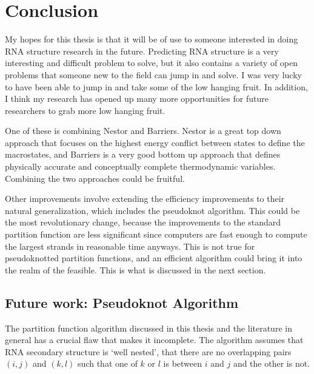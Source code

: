\chapter{Conclusion}

My hopes for this thesis is that it will be of use to someone
interested in doing RNA structure research in the future. Predicting
RNA structure is a very interesting and difficult problem to solve,
but it also contains a variety of open problems that someone new to
the field can jump in and solve. I was very lucky to have been able to
jump in and take some of the low hanging fruit. In addition, I think
my research has opened up many more opportunities for future
researchers to grab more low hanging fruit.

One of these is combining Nestor and Barriers. Nestor is a great top
down approach that focuses on the highest energy conflict between
states to define the macrostates, and Barriers is a very good bottom
up approach that defines physically accurate and conceptually complete
thermodynamic variables. Combining the two approaches could be
fruitful.

Other improvements involve extending the efficiency improvements to
their natural generalization, which includes the pseudoknot
algorithm. This could be the most revolutionary change, because the
improvements to the standard partition function are less significant
since computers are fast enough to compute the largest strands in
reasonable time anyways. This is not true for pseudoknotted partition
functions, and an efficient algorithm could bring it into the realm of
the feasible. This is what is discussed in the next section. 

\section{Future work: Pseudoknot Algorithm}

The partition function algorithm discussed in this thesis and the
literature in general has a crucial flaw that makes it incomplete. The
algorithm assumes that RNA secondary structure is `well nested', that
there are no overlapping pairs $(i, j)$ and $(k, l)$ such that one of
$k$ or $l$ is between $i$ and $j$ and the other is not.

